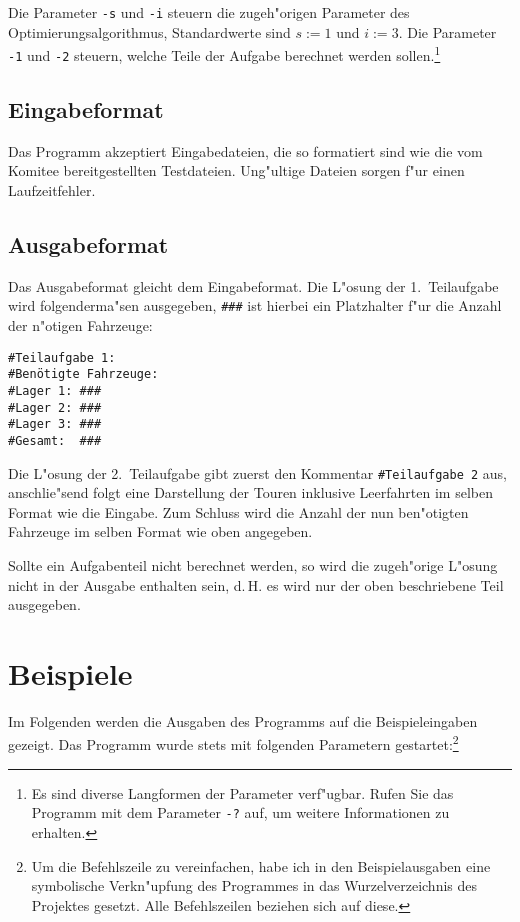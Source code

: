 \documentclass{scrreprt}
\begin{document}
Die Parameter \texttt{-s} und \texttt{-i} steuern die zugeh"origen Parameter des
Optimierungsalgorithmus, Standardwerte sind $s := 1$ und $i := 3$. Die Parameter
\texttt{-1} und \texttt{-2} steuern, welche Teile der Aufgabe berechnet werden
sollen.\footnote{Es sind diverse Langformen der Parameter verf"ugbar.  Rufen Sie
das Programm mit dem Parameter \texttt{-?} auf, um weitere Informationen zu
erhalten.}

\section{Eingabeformat}
Das Programm akzeptiert Eingabedateien, die so formatiert sind wie die vom
Komitee bereitgestellten Testdateien.  Ung"ultige Dateien sorgen f"ur einen
Laufzeitfehler.

\section{Ausgabeformat}
Das Ausgabeformat gleicht dem Eingabeformat.  Die L"osung der 1.\ Teilaufgabe
wird folgenderma"sen ausgegeben, \texttt{\#\#\#} ist hierbei ein Platzhalter
f"ur die Anzahl der n"otigen Fahrzeuge:

\begin{verbatim}
#Teilaufgabe 1:
#Benötigte Fahrzeuge:
#Lager 1: ###
#Lager 2: ###
#Lager 3: ###
#Gesamt:  ###
\end{verbatim}

Die L"osung der 2.\ Teilaufgabe gibt zuerst den Kommentar \texttt{\#Teilaufgabe\ 
2} aus, anschlie"send folgt eine Darstellung der Touren inklusive Leerfahrten
im selben Format wie die Eingabe.  Zum Schluss wird die Anzahl der nun
ben"otigten Fahrzeuge im selben Format wie oben angegeben.

Sollte ein Aufgabenteil nicht berechnet werden, so wird die zugeh"orige L"osung
nicht in der Ausgabe enthalten sein, d.\,H. es wird nur der oben beschriebene
Teil ausgegeben.

\chapter{Beispiele}
Im Folgenden werden die Ausgaben des Programms auf die Beispieleingaben gezeigt.
Das Programm wurde stets mit folgenden Parametern gestartet:\footnote{Um die
Befehlszeile zu vereinfachen, habe ich in den Beispielausgaben eine symbolische
Verkn"upfung des Programmes in das Wurzelverzeichnis des Projektes gesetzt. Alle
Befehlszeilen beziehen sich auf diese.}
\end{document}
